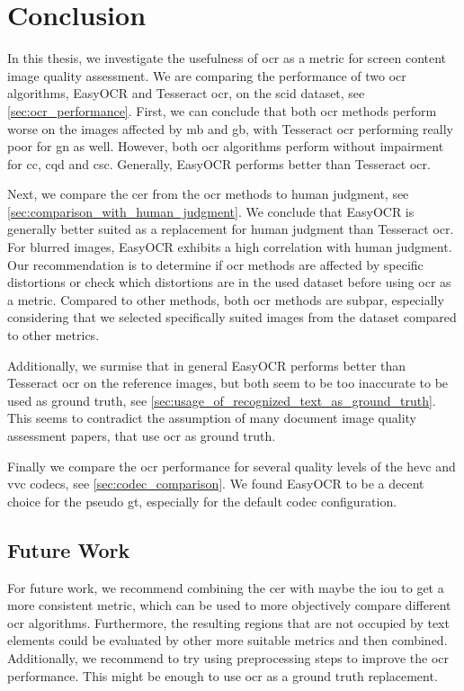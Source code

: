 \chapter{Conclusion}
\label{chap:conclusion}

In this thesis, we investigate the usefulness of \gls{ocr} as a metric for screen content image quality assessment.
We are comparing the performance of two \gls{ocr} algorithms, EasyOCR and Tesseract \gls{ocr}, on the \gls{scid} dataset, see \autoref{sec:ocr_performance}.
First, we can conclude that both \gls{ocr} methods perform worse on the images affected by \gls{mb} and \gls{gb}, with Tesseract \gls{ocr} performing really poor for \gls{gn} as well.
However, both \gls{ocr} algorithms perform without impairment for \gls{cc}, \gls{cqd} and \gls{csc}.
Generally, EasyOCR performs better than Tesseract \gls{ocr}.

Next, we compare the \gls{cer} from the \gls{ocr} methods to human judgment, see \autoref{sec:comparison_with_human_judgment}.
We conclude that EasyOCR is generally better suited as a replacement for human judgment than Tesseract \gls{ocr}.
For blurred images, EasyOCR exhibits a high correlation with human judgment.
Our recommendation is to determine if \gls{ocr} methods are affected by specific distortions or check which distortions are in the used dataset before using \gls{ocr} as a metric.
Compared to other methods, both \gls{ocr} methods are subpar, especially considering that we selected specifically suited images from the dataset compared to other metrics. 

Additionally, we surmise that in general EasyOCR performs better than Tesseract \gls{ocr} on the reference images, but both seem to be too inaccurate to be used as ground truth, see \autoref{sec:usage_of_recognized_text_as_ground_truth}.
This seems to contradict the assumption of many document image quality assessment papers, that use \gls{ocr} as ground truth.

Finally we compare the \gls{ocr} performance for several quality levels of the \gls{hevc} and \gls{vvc} codecs, see \autoref{sec:codec_comparison}.
We found EasyOCR to be a decent choice for the pseudo \gls{gt}, especially for the default codec configuration.


\section{Future Work}
\label{sec:future}

For future work, we recommend combining the \gls{cer} with maybe the \gls{iou} to get a more consistent metric, which can be used to more objectively compare different \gls{ocr} algorithms.
Furthermore, the resulting regions that are not occupied by text elements could be evaluated by other more suitable metrics and then combined.
Additionally, we recommend to try using preprocessing steps to improve the \gls{ocr} performance.
This might be enough to use \gls{ocr} as a ground truth replacement.
